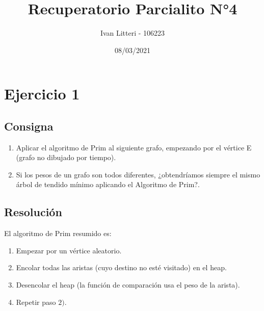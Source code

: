 \documentclass{article}
\title{Recuperatorio Parcialito N°4}
\author{Ivan Litteri - 106223}
\date{08/03/2021}
\begin{document}
\maketitle

\lstset{language=Python}

\section*{Ejercicio 1}

\subsection*{Consigna}

\begin{enumerate}[label=\alph*)]
    \item Aplicar el algoritmo de Prim al siguiente grafo, empezando por el vértice E (grafo no dibujado por tiempo).
    \item Si los pesos de un grafo son todos diferentes, ¿obtendríamos siempre el mismo árbol de tendido mínimo aplicando el
    Algoritmo de Prim?.
\end{enumerate}

\subsection*{Resolución}

El algoritmo de Prim resumido es:
\begin{enumerate}
    \item Empezar por un vértice aleatorio.
    \item Encolar todas las aristas (cuyo destino no esté visitado) en el heap.
    \item Desencolar el heap (la función de comparación usa el peso de la arista).
    \item Repetir paso $2)$.
\end{enumerate}
\end{document}
